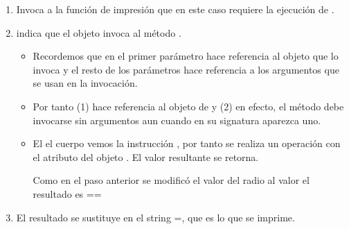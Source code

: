 \begin{itemize}
	\begin{enumerate}
	\item Invoca a la función de impresión que en este caso requiere la ejecución de .
	
	\item {} indica que el objeto  invoca al método .
		\begin{itemize}
		\item Recordemos que en  el primer parámetro hace referencia al objeto que lo invoca y el resto de los parámetros hace referencia a los argumentos que se usan en la invocación.
		\item Por tanto (1)  hace referencia al objeto de  y (2) en efecto, el método  debe invocarse sin argumentos aun cuando en su signatura aparezca uno. 
		\item El el cuerpo vemos la instrucción , por tanto se realiza un operación con el atributo  del objeto . El valor resultante se retorna.
		
		Como en el paso anterior se modificó el valor del radio al valor  el resultado es ==
		\end{itemize}
	\item El resultado se sustituye en el string =, que es lo que se imprime.
	\end{enumerate}
\end{itemize}

